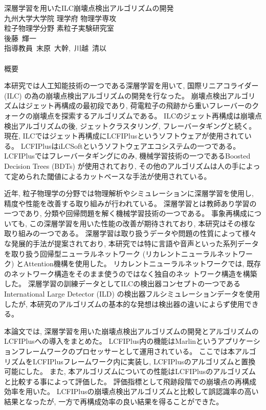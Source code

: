 
\begin{center}
\thispagestyle{empty}
{\Large 深層学習を用いたILC崩壊点検出アルゴリズムの開発}\\
九州大学大学院 理学府 物理学専攻 \\ 粒子物理学分野 素粒子実験研究室 \\
後藤\ 輝一 \\[1ex] 指導教員\ 末原\ 大幹,\ 川越\ 清以\\ 　 \\
\fi
{\huge 概要}\\
\end{center}

本研究では人工知能技術の一つである深層学習を用いて, 国際リニアコライダー (ILC) の為の崩壊点検出アルゴリズムの開発を行なった。
崩壊点検出アルゴリズムはジェット再構成の最初段であり, 荷電粒子の飛跡から重いフレーバーのクォークの崩壊点を探索するアルゴリズムである。
ILCのジェット再構成は崩壊点検出アルゴリズムの後, ジェットクラスタリング, フレーバータギングと続く。
現在, ILCではジェット再構成にLCFIPlusというソフトウェアが使用されている。
LCFIPlusはiLCSoftというソフトウェアエコシステムの一つである。
LCFIPlusではフレーバータギングにのみ, 機械学習技術の一つであるBoosted Decision Trees (BDTs) が使用されており, その他のアルゴリズムは人の手によって定められた閾値によるカットベースな手法が使用されている。

近年, 粒子物理学の分野では物理解析やシミュレーションに深層学習を使用し, 精度や性能を改善する取り組みが行われている。
深層学習とは教師あり学習の一つであり, 分類や回帰問題を解く機械学習技術の一つである。
事象再構成についても, この深層学習を用いた性能の改善が期待されており, 本研究はその様な取り組みの一つである。
深層学習は取り扱うデータや問題の性質によって様々な発展的手法が提案されており, 本研究では特に言語や音声といった系列データを取り扱う回帰型ニューラルネットワーク (リカレントニューラルネットワーク) とAttention機構を使用した。
リカレントニューラルネットワークでは, 既存のネットワーク構造をそのまま使うのではなく独自のネッ トワーク構造を構築した。
深層学習の訓練データとしてILCの検出器コンセプトの一つであるInternational Large Detector (ILD) の検出器フルシミュレーションデータを使用したが, 本研究のアルゴリズムの基本的な発想は検出器の違いによらず使用できる。

本論文では, 深層学習を用いた崩壊点検出アルゴリズムの開発とアルゴリズムのLCFIPlusへの導入をまとめた。
LCFIPlus内の機能はMarlinというアプリケーションフレームワークのプロセッサーとして運用されている。
ここでは本アルゴリズムをLCFIPlusフレームワーク内に実装し, LCFIPlusのアルゴリズムと置換可能にした。
また, 本アルゴリズムについての性能はLCFIPlusのアルゴリズムと比較する事によって評価した。
評価指標として飛跡段階での崩壊点の再構成効率を用いた。
LCFIPlusの崩壊点検出アルゴリズムと比較して誤認識率の高い結果となったが, 一方で再構成効率の良い結果を得ることができた。